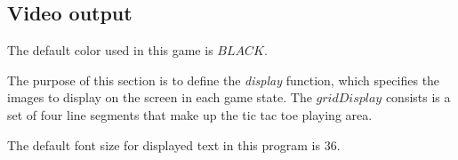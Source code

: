 \documentclass{../src/led_doc}
\begin{document}
\begin{ledCmnt}
\section{Video output}

The default color used in this game is $BLACK$.
\end{ledCmnt}

\begin{ledDef}
\end{ledDef}

\begin{ledDef}
\end{ledDef}

\begin{ledDef}
\end{ledDef}

\begin{ledDef}
\end{ledDef}

\begin{ledDef}
\end{ledDef}

\begin{ledCmnt}
The purpose of this section is to define the {\em display} function,
which specifies the images to display on the screen in each game state.
The  $gridDisplay$ consists is a set of four line segments that make up the tic
tac toe playing area.
\end{ledCmnt}

\begin{ledDef}
\end{ledDef}

\begin{ledCmnt}
The default font size for displayed text in this program is 36.
\end{ledCmnt}
\end{document}
